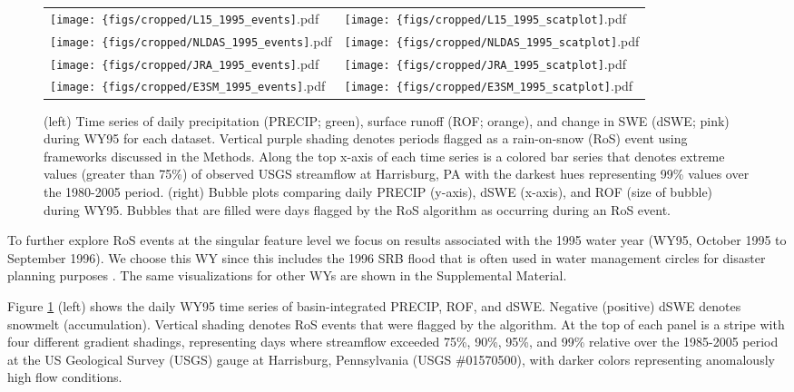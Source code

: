 \documentclass[draft]{agujournal2019}
\begin{document}
\begin{figure}
\centering
\begin{tabularx}{\textwidth}{XX}
\texttt{[image: \{figs/cropped/L15\_1995\_events]}.pdf} & \texttt{[image: \{figs/cropped/L15\_1995\_scatplot]}.pdf} \\ \texttt{[image: \{figs/cropped/NLDAS\_1995\_events]}.pdf} & \texttt{[image: \{figs/cropped/NLDAS\_1995\_scatplot]}.pdf} \\
    \texttt{[image: \{figs/cropped/JRA\_1995\_events]}.pdf} & \texttt{[image: \{figs/cropped/JRA\_1995\_scatplot]}.pdf} \\\texttt{[image: \{figs/cropped/E3SM\_1995\_events]}.pdf} & \texttt{[image: \{figs/cropped/E3SM\_1995\_scatplot]}.pdf}
\end{tabularx}
\caption{(left) Time series of daily precipitation (PRECIP; green), surface runoff (ROF; orange), and change in SWE (dSWE; pink) during WY95 for each dataset. Vertical purple shading denotes periods flagged as a rain-on-snow (RoS) event using frameworks discussed in the Methods. Along the top x-axis of each time series is a colored bar series that denotes extreme values (greater than 75\%) of observed USGS streamflow at Harrisburg, PA with the darkest hues representing 99\% values over the 1980-2005 period. (right) Bubble plots comparing daily PRECIP (y-axis), dSWE (x-axis), and ROF (size of bubble) during WY95. Bubbles that are filled were days flagged by the RoS algorithm as occurring during an RoS event.}
\label{fig:merged-wy}
\end{figure}

To further explore RoS events at the singular feature level we focus on results associated with the 1995 water year (WY95, October 1995 to September 1996). We choose this WY since this includes the 1996 SRB flood that is often used in water management circles for disaster planning purposes \citep{leathers1998severe}. 
The same visualizations for other WYs are shown in the Supplemental Material.

Figure \ref{fig:merged-wy} (left) shows the daily WY95 time series of basin-integrated PRECIP, ROF, and dSWE.
Negative (positive) dSWE denotes snowmelt (accumulation). 
Vertical shading denotes RoS events that were flagged by the algorithm. 
At the top of each panel is a stripe with four different gradient shadings, representing days where streamflow exceeded 75\%, 90\%, 95\%, and 99\% relative over the 1985-2005 period at the US Geological Survey (USGS) gauge at Harrisburg, Pennsylvania (USGS \#01570500), with darker colors representing anomalously high flow conditions.
\end{document}
